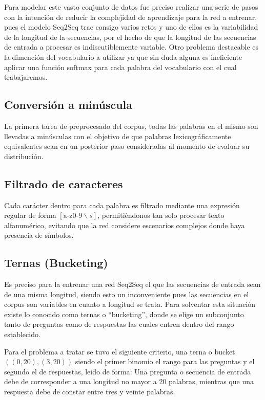 \documentclass[12pt, letterpaper]{article}
\begin{document}
        Para modelar este vasto conjunto de datos fue preciso realizar una serie de pasos con la intención de reducir la complejidad de aprendizaje para la red a entrenar, pues el modelo Seq2Seq trae consigo varios retos y uno de ellos es la variabilidad de la longitud de la secuencias, por el hecho de que la longitud de las secuencias de entrada a procesar es indiscutiblemente variable. Otro problema destacable es la dimención del vocabulario a utilizar ya que sin duda alguna es ineficiente aplicar una función softmax para cada palabra del vocabulario con el cual trabajaremos\cite{Ramamoorthy}.
        
        \subsection{Conversión a minúscula}
        La primera tarea de preprocesado del corpus, todas las palabras en el mismo son llevadas a minúsculas con el objetivo de que palabras lexicográficamente equivalentes sean en un posterior paso consideradas al momento de evaluar su distribución.
        
        \subsection{Filtrado de caracteres}
        Cada carácter dentro para cada palabra es filtrado mediante una expresión regular de forma $[\text{a-z0-9}\backslash{s}]$, permitiéndonos tan solo procesar texto alfanumérico, evitando que la red considere escenarios complejos donde haya presencia de símbolos.
        
        \subsection{Ternas (Bucketing)}
        Es preciso para la entrenar una red Seq2Seq el que las secuencias de entrada sean de una misma longitud, siendo esto un inconveniente pues las secuencias en el corpus son variables en cuanto a longitud se trata. Para solventar esta situación existe lo conocido como ternas o “bucketing”, donde se elige un subconjunto tanto de preguntas como de respuestas las cuales entren dentro del rango establecido.
        
        Para el problema a tratar se tuvo el siguiente criterio, una terna o bucket $((0,20),(3,20))$ siendo el primer binomio el rango para las preguntas y el segundo el de respuestas, leído de forma: Una pregunta o secuencia de entrada debe de corresponder a una longitud no mayor a 20 palabras, mientras que una respuesta debe de constar entre tres y veinte palabras.
        
\end{document}
